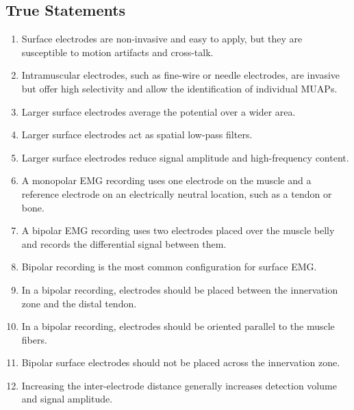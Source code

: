 \subsection{True Statements}

\begin{enumerate}[label=\arabic*.]
    \item Surface electrodes are non-invasive and easy to apply, but they are susceptible to motion artifacts and cross-talk.
    
    \item Intramuscular electrodes, such as fine-wire or needle electrodes, are invasive but offer high selectivity and allow the identification of individual MUAPs.
    
    \item Larger surface electrodes average the potential over a wider area.
    
   \item Larger surface electrodes act as spatial low-pass filters.
    
    \item Larger surface electrodes reduce signal amplitude and high-frequency content.
    
    \item A monopolar EMG recording uses one electrode on the muscle and a reference electrode on an electrically neutral location, such as a tendon or bone.
    
    \item A bipolar EMG recording uses two electrodes placed over the muscle belly and records the differential signal between them.
    
    \item Bipolar recording is the most common configuration for surface EMG.
    
    \item In a bipolar recording, electrodes should be placed between the innervation zone and the distal tendon.
    
    \item In a bipolar recording, electrodes should be oriented parallel to the muscle fibers.
    
    \item Bipolar surface electrodes should not be placed across the innervation zone.
    
    \item Increasing the inter-electrode distance generally increases detection volume and signal amplitude.
    

\end{enumerate}
